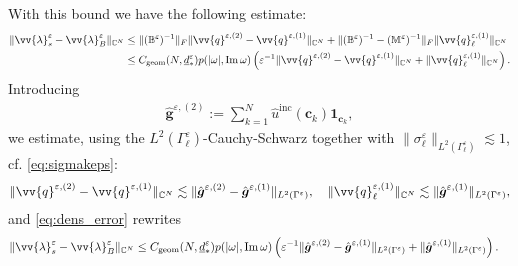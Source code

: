 \documentclass[]{article}
\numberwithin{equation}{section}
\numberwithin{theorem}{section}
\numberwithin{lemma}{section}
\numberwithin{corollary}{section}
\numberwithin{proposition}{section}
\numberwithin{definition}{section}
\newcommand{\re}{\varepsilon}
\renewcommand{\vec}{\boldsymbol}
\renewcommand{\Im}{\operatorname{Im}}
\begin{document}
\begin{appendices}
		With this bound we have the following estimate: 
		\begin{align}
			\label{eq:dens_error}
			\begin{split}
				\|\vv{\lambda}_s^{\re}-\vv{\lambda}_B^{\re} \|_{\mathbb{C}^N}&\leq \|(\mathbb{B}^{\re})^{-1}\|_F \|\vv{q}^{\re,(2)}-\vv{q}^{\re,(1)}\|_{\mathbb{C}^N}+\|(\mathbb{B}^{\re})^{-1}-(\mathbb{M}^{\re})^{-1}\|_F \|\vv{q}_{\ell}^{\re,(1)}\|_{\mathbb{C}^N}\\
				&\leq C_{\operatorname{geom}}(N, \underline{d}_*^{\re})p(|\omega|, \Im \omega)\left(\re^{-1}\|\vv{q}^{\re,(2)}-\vv{q}^{\re,(1)}\|_{\mathbb{C}^N}+\|\vv{q}_{\ell}^{\re,(1)}\|_{\mathbb{C}^N}\right).
			\end{split}
		\end{align}
		Introducing 
		\begin{align*}%
			\hat{\boldsymbol{g}}^{\re,(2)}:=\sum\limits_{k=1}^N \hat{u}^{\operatorname{inc}}(\vec{c}_k)\mathbf{1}_{\vec{c}_k},
		\end{align*}
		we estimate, using the $L^2(\Gamma_{\ell}^{\re})$-Cauchy-Schwarz together with $\|\sigma_{\ell}^{\re}\|_{L^2(\Gamma_{\ell}^{\re})}\lesssim 1$, cf. \eqref{eq:sigmakeps}:
		\begin{align*}%
			\|\vv{q}^{\re,(2)}-\vv{q}^{\re,(1)}\|_{\mathbb{C}^N} \lesssim \|	\hat{\vec{g}}^{\re,(2)}-	\hat{\vec{g}}^{\re,(1)}\|_{L^2(\Gamma^{\re})}, \quad 
			\|\vv{q}_{\ell}^{\re,(1)}\|_{\mathbb{C}^N}\lesssim \| \hat{\vec{g}}^{\re,(1)}\|_{L^2(\Gamma^{\re})},
		\end{align*}
		and \eqref{eq:dens_error} rewrites 
		\begin{align}
			\label{eq:dens_error_main}
			\begin{split}
				\|\vv{\lambda}_s^{\re}-\vv{\lambda}_B^{\re} \|_{\mathbb{C}^N}
				&\leq C_{\operatorname{geom}}(N, \underline{d}_*^{\re})p(|\omega|, \Im \omega)\left(\re^{-1}\|	\hat{\vec{g}}^{\re,(2)}-	\hat{\vec{g}}^{\re,(1)}\|_{L^2(\Gamma^{\re})}+ \|	\hat{\vec{g}}^{\re,(1)}\|_{L^2(\Gamma^{\re})}\right).
			\end{split}
		\end{align}
		

\end{appendices}
\end{document}
